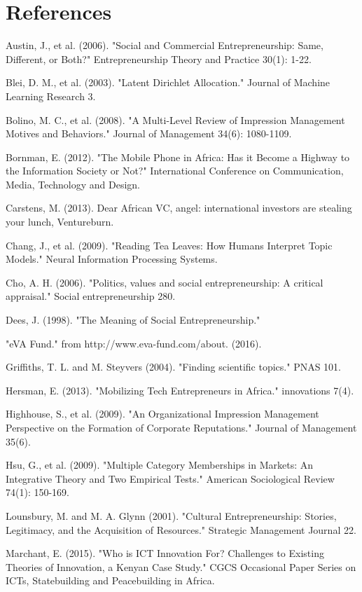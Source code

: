 \documentclass[12pt]{article}
\begin{document}
\section{References}

\begingroup\small
	
	
Austin, J., et al. (2006). "Social and Commercial Entrepreneurship: Same, Different, or Both?" Entrepreneurship Theory and Practice 30(1): 1-22.
	
Blei, D. M., et al. (2003). "Latent Dirichlet Allocation." Journal of Machine Learning Research 3.
	
Bolino, M. C., et al. (2008). "A Multi-Level Review of Impression Management Motives and Behaviors." Journal of Management 34(6): 1080-1109.
	
Bornman, E. (2012). "The Mobile Phone in Africa: Has it Become a Highway to the Information Society or Not?" International Conference on Communication, Media, Technology and Design.
	
Carstens, M. (2013). Dear African VC, angel: international investors are stealing your lunch, Ventureburn.
	
Chang, J., et al. (2009). "Reading Tea Leaves: How Humans Interpret Topic Models." Neural Information Processing Systems.
	
Cho, A. H. (2006). "Politics, values and social entrepreneurship: A critical appraisal." Social entrepreneurship 280.
	
Dees, J. (1998). "The Meaning of Social Entrepreneurship."

"eVA Fund." from http://www.eva-fund.com/about. (2016). 
	
Griffiths, T. L. and M. Steyvers (2004). "Finding scientific topics." PNAS 101.
	
Hersman, E. (2013). "Mobilizing Tech Entrepreneurs in Africa." innovations 7(4).
	
Highhouse, S., et al. (2009). "An Organizational Impression Management Perspective on the Formation of Corporate Reputations." Journal of Management 35(6).
	
Hsu, G., et al. (2009). "Multiple Category Memberships in Markets: An Integrative Theory and Two Empirical Tests." American Sociological Review 74(1): 150-169.
	
Lounsbury, M. and M. A. Glynn (2001). "Cultural Entrepreneurship: Stories, Legitimacy, and the Acquisition of Resources." Strategic Management Journal 22.
	
Marchant, E. (2015). "Who is ICT Innovation For? Challenges to Existing Theories of Innovation, a Kenyan Case Study." CGCS Occasional Paper Series on ICTs, Statebuilding and Peacebuilding in Africa.
	
\end{document}
